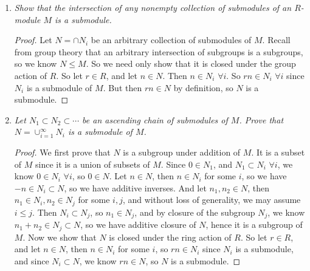 \documentclass[12pt]{amsbook}
\theoremstyle{plain}
\numberwithin{section}{chapter}
\numberwithin{equation}{chapter}
\theoremstyle{definition}
\theoremstyle{remark}
\renewcommand{\leq}{\leqslant}
\begin{document}
\begin{enumerate}[label=\arabic*.]
\begin{proof}
We know $IM$ is nonempty since $I$ contains $0$, so $0m \in IM$, and by exercise 1, we know $0 \in IM$. So let $x,y \in IM$ such that:
$$
x = a_1m_1 + \cdots + a_km_k
$$
$$
y = b_1n_1 + \cdots + b_ln_l
$$
 with $a_i,b_i \in I$, $m_i,n_i \in M$, and let $r \in R$. Then we have the following by the distributive property of scalars in the definition of an $R$-module: 
\begin{equation}
\begin{aligned}
x + ry &= a_1m_1 + \cdots + a_km_k + r(b_1n_1 + \cdots + b_ln_l)\\
&= a_1m_1 + \cdots + a_km_k + rb_1n_1 + \cdots rb_ln_l.
\end{aligned}
\end{equation}
Now since $I$ is a left ideal, we know $rb_i \in I$ since $b_i \in I$, so $x + ry$ is a finite sum of elements of the form $a_im_i$ and so it is in $IM$. Then by the submodule criterion, $IM$ is a submodule of $M$. 
\end{proof}

\vspace{3mm}
\item \textit{Show that the intersection of any nonempty collection of submodules of an $R$-module $M$ is a submodule. }

\begin{proof}
Let $N = \cap N_i$ be an arbitrary collection of submodules of $M$. Recall from group theory that an arbitrary intersection of subgroups is a subgroups, so we know $N \leq M$. So we need only show that it is closed under the group action of $R$. So let $r \in R$, and let $n \in N$. Then $n \in N_i$ $\forall i$. So $rn \in N_i$ $\forall i$ since $N_i$ is a submodule of $M$. But then $rn \in N$ by definition, so $N$ is a submodule. 
\end{proof}

\vspace{3mm}
\item \textit{Let $N_1 \subset N_2 \subset \cdots$ be an ascending chain of submodules of $M$. Prove that $N = \cup_{i = 1}^\infty N_i$ is a submodule of $M$. }

\begin{proof}
We first prove that $N$ is a subgroup under addition of $M$. It is a subset of $M$ since it is a union of subsets of $M$. Since $0 \in N_1$, and $N_1 \subset N_i$ $\forall i$, we know $0 \in N_i$ $\forall i$, so $0 \in N$. Let $n \in N$, then $n \in N_i$ for some $i$, so we have $-n \in N_i \subset N$, so we have additive inverses. And let $n_1,n_2 \in N$, then $n_1 \in N_i,n_2 \in N_j$ for some $i,j$, and without loss of generality, we may assume $i \leq j$. Then $N_i \subset N_j$, so $n_1 \in N_j$, and by closure of the subgroup $N_j$, we know $n_1 + n_2 \in N_j \subset N$, so we have additive closure of $N$, hence it is a subgroup of $M$. Now we show that $N$ is closed under the ring action of $R$. So let $r \in R$, and let $n \in N$, then $n \in N_i$ for some $i$, so $rn \in N_i$ since $N_i$ is a submodule, and since $N_i \subset N$, we know $rn \in N$, so $N$ is a submodule. 
\end{proof}


\end{enumerate}
\end{document}
